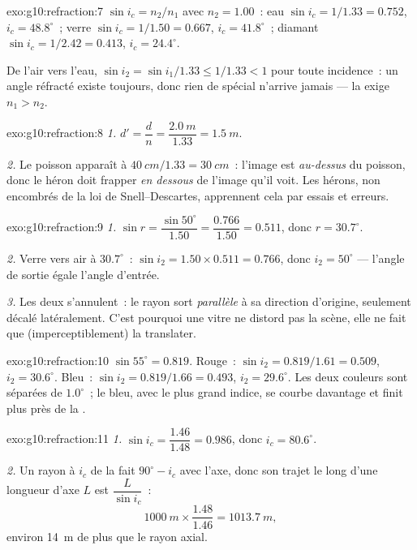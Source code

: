 \begin{solution}{exo:g10:refraction:7}
$\sin i_c = n_2/n_1$ avec $n_2 = 1.00$~:
eau $\sin i_c = 1/1.33 = 0.752$, $i_c = 48.8^\circ$~;
verre $\sin i_c = 1/1.50 = 0.667$, $i_c = 41.8^\circ$~;
diamant $\sin i_c = 1/2.42 = 0.413$, $i_c = 24.4^\circ$.

De l'air vers l'eau, $\sin i_2 = \sin i_1/1.33 \leq 1/1.33 < 1$ pour
toute incidence~: un angle réfracté existe toujours, donc rien de
spécial n'arrive jamais --- la  exige
$n_1 > n_2$.
\end{solution}

\begin{solution}{exo:g10:refraction:8}
\emph{1.} $d' = \dfrac{d}{n} = \dfrac{\qty{2.0}{m}}{1.33}
= \qty{1.5}{m}$.

\emph{2.} Le poisson apparaît à $\qty{40}{cm}/1.33 = \qty{30}{cm}$~:
l'image est \emph{au-dessus} du poisson, donc le héron doit frapper
\emph{en dessous} de l'image qu'il voit. Les hérons, non encombrés de
la loi de Snell--Descartes, apprennent cela par essais et
erreurs.
\end{solution}

\begin{solution}{exo:g10:refraction:9}
\emph{1.} $\sin r = \dfrac{\sin 50^\circ}{1.50} = \dfrac{0.766}{1.50}
= 0.511$, donc $r = 30.7^\circ$.

\emph{2.} Verre vers air à $30.7^\circ$~:
$\sin i_2 = 1.50 \times 0.511 = 0.766$, donc $i_2 = 50^\circ$ ---
l'angle de sortie égale l'angle d'entrée.

\emph{3.} Les deux  s'annulent~: le rayon sort
\emph{parallèle} à sa direction d'origine, seulement décalé
latéralement. C'est pourquoi une vitre ne distord pas la scène, elle
ne fait que (imperceptiblement) la translater.
\end{solution}

\begin{solution}{exo:g10:refraction:10}
$\sin 55^\circ = 0.819$. Rouge~:
$\sin i_2 = 0.819/1.61 = 0.509$, $i_2 = 30.6^\circ$. Bleu~:
$\sin i_2 = 0.819/1.66 = 0.493$, $i_2 = 29.6^\circ$. Les deux couleurs
sont séparées de $1.0^\circ$~; le bleu, avec le plus grand indice, se
courbe davantage et finit plus près de la .
\end{solution}

\begin{solution}{exo:g10:refraction:11}
\emph{1.} $\sin i_c = \dfrac{1.46}{1.48} = 0.986$, donc
$i_c = 80.6^\circ$.

\emph{2.} Un rayon à $i_c$ de la  fait $90^\circ - i_c$ avec
l'axe, donc son trajet le long d'une longueur d'axe $L$ est
$\dfrac{L}{\sin i_c}$~:
\[
\qty{1000}{m} \times \frac{1.48}{1.46} = \qty{1013.7}{m},
\]
environ \qty{14}{m} de plus que le rayon axial.
\end{solution}

